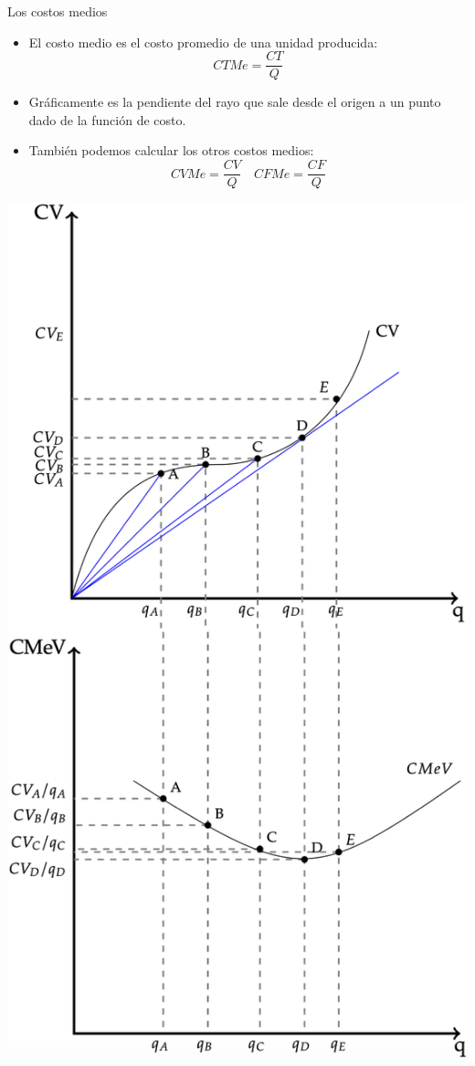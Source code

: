 \documentclass{beamer}
\begin{document}
\begin{frame}{Los costos medios}
    \begin{minipage}{0.45\textwidth}
            \begin{itemize}
            \item El costo medio es el costo promedio de una unidad producida:
                \[ CTMe = \frac{CT}{Q} \]
            \item Gráficamente es la pendiente del rayo que sale desde el origen a un punto dado de la función de costo. 
            \item También podemos calcular los otros costos medios:
            \[
            CVMe = \frac{CV}{Q} \quad CFMe = \frac{CF}{Q}
            \]
            \end{itemize}
    \end{minipage}
    \hfill
    \begin{minipage}{0.4\textwidth}
    \includegraphics[scale=0.31]{../Figures/C13.5.png}
    \end{minipage}
\end{frame}
\end{document}
